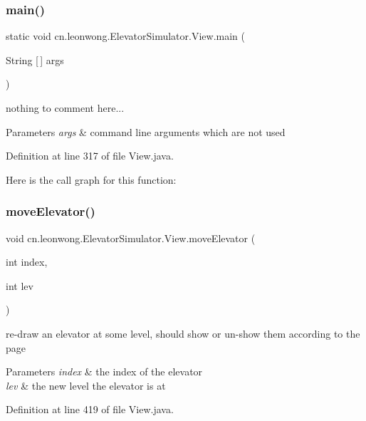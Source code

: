 \subsubsection{\texorpdfstring{main()}{main()}}
{\footnotesize\ttfamily static void cn.\+leonwong.\+Elevator\+Simulator.\+View.\+main (\begin{DoxyParamCaption}\item[{String \mbox{[}$\,$\mbox{]}}]{args }\end{DoxyParamCaption})\hspace{0.3cm}{\ttfamily [static]}}

nothing to comment here... 
\begin{DoxyParams}{Parameters}
{\em args} & command line arguments which are not used \\
\hline
\end{DoxyParams}


Definition at line 317 of file View.\+java.

Here is the call graph for this function\+:
\mbox{\label{classcn_1_1leonwong_1_1_elevator_simulator_1_1_view_af6d3d9a99e60ae5cdcb26d16fe8f19b5}} 
\subsubsection{\texorpdfstring{move\+Elevator()}{moveElevator()}}
{\footnotesize\ttfamily void cn.\+leonwong.\+Elevator\+Simulator.\+View.\+move\+Elevator (\begin{DoxyParamCaption}\item[{int}]{index,  }\item[{int}]{lev }\end{DoxyParamCaption})}

re-\/draw an elevator at some level, should show or un-\/show them according to the page 
\begin{DoxyParams}{Parameters}
{\em index} & the index of the elevator \\
\hline
{\em lev} & the new level the elevator is at \\
\hline
\end{DoxyParams}


Definition at line 419 of file View.\+java.

